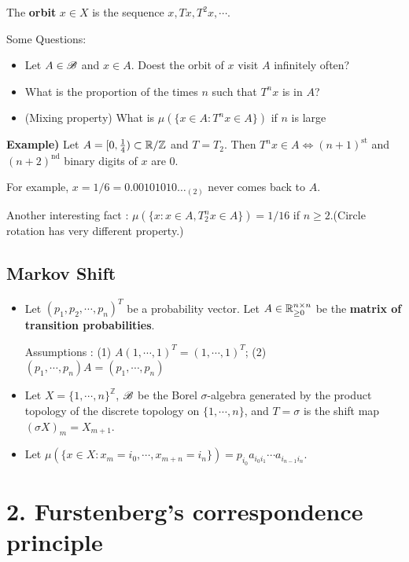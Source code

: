 \documentclass[12pt,a4paper]{report}
\begin{document}
The \textbf{orbit} $x \in X$ is the sequence $x, Tx, T^2 x, \cdots$.
\s

Some Questions:

\begin{itemize}
\item Let $A \in \mathscr{B}$ and $ x\in A$. Doest the orbit of $x$ visit $A$ infinitely often?

\item What is the proportion of the times $n$ such that $T^n x$ is in $A$? 

\item (Mixing property) What is $\mu(\{x \in A : T^nx \in A\})$ if $n$ is large
\end{itemize}
\s

\textbf{Example)} Let $A = [0,\frac{1}{4}) \subset \mathbb{R}/\mathbb{Z}$ and $T = T_2$. Then $T^n x \in A \Leftrightarrow (n+1)^{\text{st}}$ and $(n+2)^{\text{nd}}$ binary digits of $x$ are 0.

For example, $x = 1/6 = 0.00101010\ldots_{(2)}$ never comes back to $A$.

Another interesting fact : $\mu(\{x : x\in A, T_2^n x \in A \}) = 1/16$ if $n\geq2$.(Circle rotation has very different property.)
\s

\subsection*{Markov Shift}

\begin{itemize}
\item Let $(p_1, p_2, \cdots, p_n)^T$ be a probability vector. Let $A \in \mathbb{R}_{\geq 0}^{n\times n}$ be the \textbf{matrix of transition probabilities}.

Assumptions : (1) $A(1,\cdots,1)^T = (1,\cdots,1)^T$; (2) $(p_1, \cdots, p_n) A = (p_1, \cdots, p_n)$

\item Let $X = \{ 1,\cdots,n\}^{\mathbb{Z}}$, $\mathscr{B}$ be the Borel $\sigma$-algebra generated by the product topology of the discrete topology on $\{1,\cdots, n\}$, and $T = \sigma$ is the shift map $(\sigma X)_m = X_{m+1}$.

\item Let $\mu(\{x\in X : x_m=i_0,\cdots,x_{m+n}=i_n\}) = p_{i_0} a_{i_0 i_1} \cdots a_{i_{n-1} i_n}$.
\end{itemize}
\s

\section*{2. Furstenberg's correspondence principle}
\end{document}
